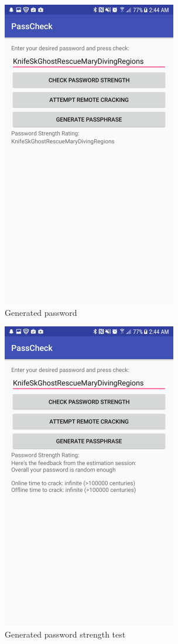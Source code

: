 \documentclass{article}
\begin{document}
\begin{figure}[ht]
      \includegraphics[width=3in]{img/t5s3.png}
      \centering
      \caption{Generated password}
\end{figure}
\begin{figure}[ht]
      \includegraphics[width=3in]{img/t5s4.png}
      \centering
      \caption{Generated password strength test}
\end{figure}

\clearpage
\end{document}
